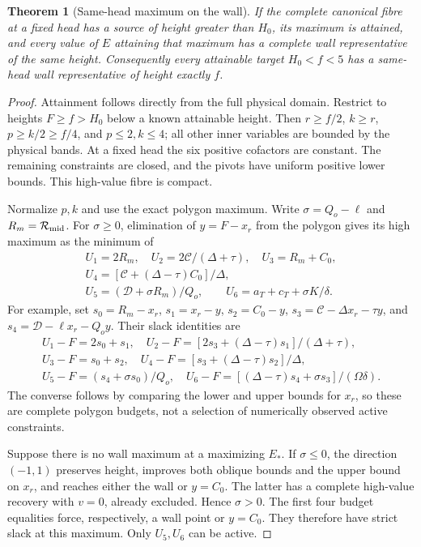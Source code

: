 \documentclass[11pt,reqno]{amsart}
\newtheorem{theorem}{Theorem}[section]
\theoremstyle{definition}
\theoremstyle{remark}
\begin{document}
\begin{theorem}[Same-head maximum on the wall]
\label{s3:wall-head-maximum}
If the complete canonical fibre at a fixed head has a source of
height greater than \(H_0\), its maximum is attained, and every
value of \(E\) attaining that maximum has a complete wall
representative of the same height. Consequently every attainable
target \(H_0<f<5\) has a same-head wall representative of height
exactly \(f\).
\end{theorem}
\begin{proof}
Attainment follows directly from the full physical domain. Restrict
to heights \(F\ge f>H_0\) below a known attainable height. Then
\(r\ge f/2\), \(k\ge r\), \(p\ge k/2\ge f/4\), and
\(p\le2,k\le4\); all other inner variables are bounded by the
physical bands. At a fixed head the six positive cofactors are
constant. The remaining constraints are closed, and the pivots have
uniform positive lower bounds. This high-value fibre is compact.

Normalize \(p,k\) and use the exact polygon maximum. Write
\(\sigma=Q_o-\ell\) and \(R_m=\mathcal R_{\rm mid}\).
For \(\sigma\ge0\), elimination of \(y=F-x_r\) from the polygon
gives its high maximum as the minimum of
\[
\begin{gathered}
 U_1=2R_m,\quad U_2=2\mathcal C/(\Delta+\tau),\quad
  U_3=R_m+C_0,\\
  U_4=[\mathcal C+(\Delta-\tau)C_0]/\Delta,\\
 U_5=(\mathcal D+\sigma R_m)/Q_o,\qquad
 U_6=a_T+c_T+\sigma K/\delta.
\end{gathered}
\]
For example, set \(s_0=R_m-x_r\), \(s_1=x_r-y\),
\(s_2=C_0-y\), \(s_3=\mathcal C-\Delta x_r-\tau y\),
and \(s_4=\mathcal D-\ell x_r-Q_oy\). Their slack identities are
\[
\begin{gathered}
 U_1-F=2s_0+s_1,\quad
 U_2-F=[2s_3+(\Delta-\tau)s_1]/(\Delta+\tau),\\
 U_3-F=s_0+s_2,\quad
 U_4-F=[s_3+(\Delta-\tau)s_2]/\Delta,\\
 U_5-F=(s_4+\sigma s_0)/Q_o,\quad
 U_6-F=[(\Delta-\tau)s_4+\sigma s_3]/(\Omega\delta).
\end{gathered}
\]
The converse follows by comparing the lower and upper bounds for
\(x_r\), so these are complete polygon budgets, not a selection
of numerically observed active constraints.

Suppose there is no wall maximum at a maximizing \(E_*\).
If \(\sigma\le0\), the direction \((-1,1)\) preserves height,
improves both oblique bounds and the upper bound on \(x_r\),
and reaches either the wall or \(y=C_0\). The latter has a
complete high-value recovery with \(v=0\), already excluded.
Hence \(\sigma>0\). The first four budget equalities force,
respectively, a wall point or \(y=C_0\). They therefore have
strict slack at this maximum. Only \(U_5,U_6\) can be active.


\end{proof}
\end{document}

